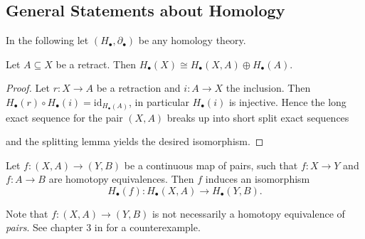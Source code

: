 \subsection{General Statements about Homology}

In the following let $(H_\bullet,\partial_\bullet)$ be any homology theory.

\begin{lemma}
    Let $A \subseteq X$ be a retract. Then $H_\bullet(X) \cong H_\bullet(X,A) \oplus H_\bullet(A)$.
\end{lemma}

\begin{proof}
    Let $r \colon X \to A$ be a retraction and $i \colon A \to X$ the inclusion. Then $H_\bullet(r) \circ H_\bullet(i) = \mathrm{id}_{H_\bullet(A)}$, in particular $H_\bullet(i)$ is injective. Hence the long exact sequence for the pair $(X,A)$ breaks up into short split exact sequences
    \begin{center}
    \end{center}
    and the splitting lemma yields the desired isomorphism.
\end{proof}

\begin{lemma}
    Let $f \colon (X,A) \to (Y,B)$ be a continuous map of pairs, such that $f \colon X \to Y$ and $f \colon A \to B$ are homotopy equivalences. Then $f$ induces an isomorphism
    \[
    H_\bullet(f) \colon H_\bullet(X,A) \to H_\bullet(Y,B).
    \] 
\end{lemma}

\begin{remark}
    Note that $f \colon (X,A) \to (Y,B)$ is not necessarily a homotopy equivalence of \textit{pairs}. See chapter 3 in \cite{steimle_alg_topo} for a counterexample.
\end{remark}

